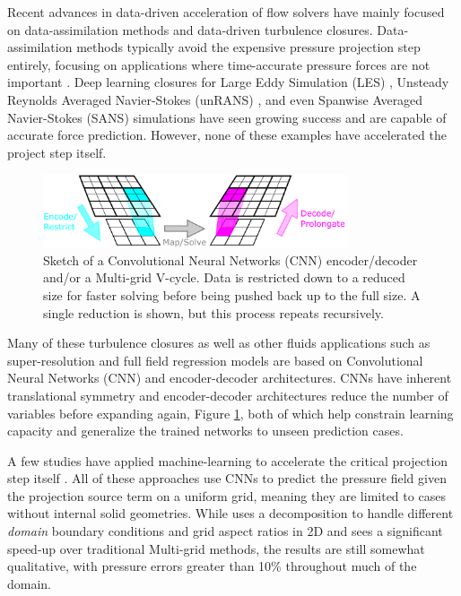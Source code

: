 \documentclass[review]{elsarticle}
\begin{document}
Recent advances in data-driven acceleration of flow solvers have mainly focused on data-assimilation methods and data-driven turbulence closures. Data-assimilation methods typically avoid the expensive pressure projection step entirely, focusing on applications where time-accurate pressure forces are not important \cite{asch2016data}. Deep learning closures for Large Eddy Simulation (LES) \cite{BECK2019108910,maulik_san_rasheed_vedula_2019}, Unsteady Reynolds Averaged Navier-Stokes (unRANS) \cite{ling_kurzawski_templeton_2016}, and even Spanwise Averaged Navier-Stokes (SANS) \cite{font2021deep} simulations have seen growing success and are capable of accurate force prediction. However, none of these examples have accelerated the project step itself.

\begin{figure}
    \centering
    \includegraphics[width=0.8\textwidth]{figures/drawing}
    \caption{Sketch of a Convolutional Neural Networks (CNN) encoder/decoder and/or a Multi-grid V-cycle. Data is restricted down to a reduced size for faster solving before being pushed back up to the full size. A single reduction is shown, but this process repeats recursively.}
    \label{fig:multigrid}
\end{figure}

Many of these turbulence closures as well as other fluids applications such as super-resolution \cite{ferdian20204dflownet,liu2020deep} and full field regression models \cite{duru2021cnnfoil,bhatnagar2019prediction} are based on Convolutional Neural Networks (CNN) and encoder-decoder architectures. CNNs have inherent translational symmetry and encoder-decoder architectures reduce the number of variables before expanding again, Figure \ref{fig:multigrid}, both of which help constrain learning capacity and generalize the trained networks to unseen prediction cases. 

A few studies have applied machine-learning to accelerate the critical projection step itself \cite{ozbay2021poisson,Xiao2020,ajuria2020}. All of these approaches use CNNs to predict the pressure field given the projection source term on a uniform grid, meaning they are limited to cases without internal solid geometries. While \cite{ozbay2021poisson} uses a decomposition to handle different \textit{domain} boundary conditions and grid aspect ratios in 2D and sees a significant speed-up over traditional Multi-grid methods, the results are still somewhat qualitative, with pressure errors greater than 10\% throughout much of the domain.
\end{document}
